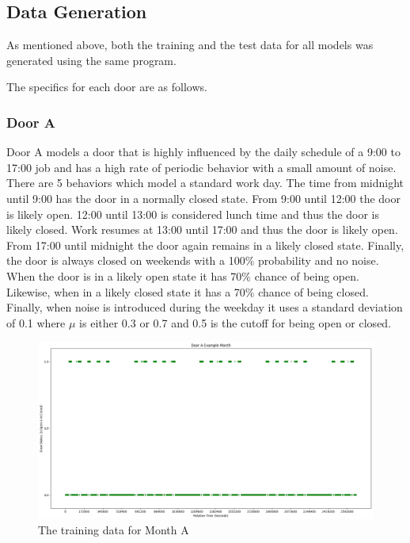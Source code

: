   \subsection{ Data Generation }

  As mentioned above, both the training and the test data for all models was
  generated using the same program.

  The specifics for each door are as follows.

  \subsubsection{ Door A }

  Door A models a door that is highly influenced by the daily schedule of a
  9:00 to 17:00 job and has a high rate of periodic behavior with a small
  amount of noise. There are 5 behaviors which model a standard work day. The
  time from midnight until 9:00 has the door in a normally closed
  state. From 9:00 until 12:00 the door is likely open. 12:00 until 13:00 is
  considered lunch time and thus the door is likely closed. Work resumes at
  13:00 until 17:00 and thus the door is likely open. From 17:00 until midnight
  the door again remains in a likely closed state. Finally, the door is always
  closed on weekends with a 100\% probability and no noise. \\

  When the door is in a likely open state it has 70\% chance of being open.
  Likewise, when in a likely closed state it has a 70\% chance of being closed.
  Finally, when noise is introduced during the weekday it uses a standard deviation
  of 0.1 where $\mu$ is either 0.3 or 0.7 and 0.5 is the cutoff for being open or
  closed. \\

  \begin{figure}[!htb]
    \centering
    \includegraphics[width=\linewidth]{images/Door_A_Example_Month.png}
    \caption{The training data for Month A}
    \label{figure:Door A Training Month}
  \end{figure}

